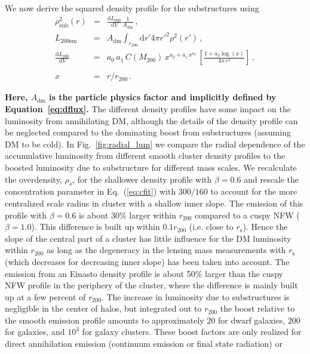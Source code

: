 \documentclass[10pt,aps,pra,reprint,amsmath,amsfonts,amssymb,showpacs,nofootinbib,floatfix]{revtex4-1}
\def\C#1{{\bf #1}}
\newcommand{\rmn}{\mathrm}
\newcommand{\s}{\rmn{s}}
\newcommand{\sm}{\rmn{sm}}
\newcommand{\dd}{\rmn{d}}
\newcommand{\rhos}{\ensuremath{\rho_s}}
\newcommand{\rvir}{r_{200}}
\newcommand{\mvir}{M_{200}}
\begin{document}
We now derive the squared density profile for the substructures
using
\begin{eqnarray}
\rho_\rmn{sub}^2(r) &=& \frac{\dd L_\rmn{sub}}{\dd V} \frac{1}{A_{\rmn{dm}}}\,,\label{eq:rho_sub}\\
L_{200\sm} &=&  A_{\rmn{dm}} \int_{\rvir} \dd r' 4\pi r'^2 \rho^2(r')\,,\label{eq:Lsm}\\
 \frac{\dd L_\rmn{sub}}{\dd V} &=& a_0\,a_1\,C(\mvir)\,x^{a_2+a_1\,x^{a_2}}\,
\left[\frac{1+a_2\log(x)}{4\pi\,r^3}\right]\,,\nonumber\\
\\
x &=& r/\rvir\,.\label{eq:xvir}
\end{eqnarray} 

\C{Here, $A_{\rmn{dm}}$ is the particle physics factor and implicitly defined by Equation~\ref{eq:dflux}.}
The different density profiles have some impact on the luminosity from
annihilating DM, although the details of the density profile can be
neglected compared to the dominating boost from substructures
(assuming DM to be cold). In Fig.~\ref{fig:radial_lum} we compare the
radial dependence of the accumulative luminosity from different smooth
cluster density profiles to the boosted luminosity due to substructure
for different mass scales. We recalculate the overdensity, $\rhos$,
for the shallower density profile with $\beta=0.6$ and rescale the
concentration parameter in Eq.~(\ref{eq:cfit}) with $300/160$
\cite{2011ApJ...728L..39N} to account for the more centralized scale
radius in cluster with a shallow inner slope. The emission of this
profile with $\beta=0.6$ is about 30\% larger within $\rvir$ compared
to a cuspy NFW ($\beta=1.0$).  This difference is built up within
$0.1\rvir$ (i.e. close to $r_\s$). Hence the slope of the central part
of a cluster has little influence for the DM luminosity within $\rvir$
as long as the degeneracy in the lensing mass measurements with $r_\s$
(which decreases for decreasing inner slope) has been taken into
account. The emission from an Einasto density profile is about 50\%
larger than the cuspy NFW profile in the periphery of the cluster,
where the difference is mainly built up at a few percent of
$\rvir$. The increase in luminosity due to substructures is negligible
in the center of halos, but integrated out to $\rvir$ the boost
relative to the smooth emission profile amounts to approximately 20
for dwarf galaxies, $200$ for galaxies, and $10^3$ for galaxy
clusters. These boost factors are only realized for direct
annihilation emission (continuum emission or final state radiation) or
\end{document}
